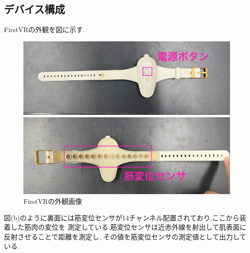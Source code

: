 \documentclass{ltjsreport}
\begin{document}
		\subsection{デバイス構成}
				FirstVRの外観を図に示す.
				\begin{figure}[H]
				\centering
				\begin{minipage}{0.75\columnwidth}
				\centering
				\includegraphics[width = \columnwidth]{../figs/IMG_0337.JPG}
				\end{minipage}
				\hspace{0.04\columnwidth}
				\begin{minipage}{0.75\columnwidth}
				\centering
				\includegraphics[width = \columnwidth]{../figs/IMG_0336.JPG}
				\end{minipage}
				\caption{FirstVRの外観画像}
				\label{fig:FirstVR}
				\end{figure}
\vspace{-15pt}

			図(b)のように裏面には筋変位センサが14チャンネル配置されており,ここから装着した筋肉の変位を
			測定している.筋変位センサは近赤外線を射出して肌表面に反射させることで距離を測定し,
			その値を筋変位センサの測定値として出力している.
\end{document}
